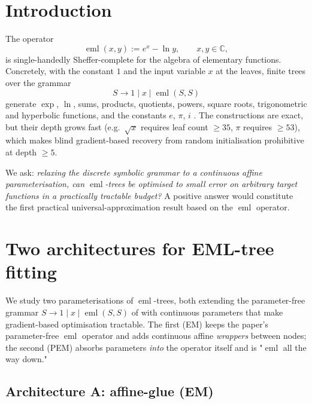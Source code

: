 \documentclass[11pt]{article}
\newcommand{\eml}{\operatorname{eml}}
\begin{document}
\section{Introduction}

The operator
\begin{equation}
\eml(x, y) := e^x - \ln y, \qquad x, y \in \mathbb{C},
\label{eq:eml}
\end{equation}
is single-handedly Sheffer-complete for the algebra of elementary functions.
Concretely, with the constant $1$ and the input variable $x$ at the leaves,
finite trees over the grammar
\[
S \to 1 \mid x \mid \eml(S, S)
\]
generate $\exp$, $\ln$, sums, products, quotients, powers, square roots,
trigonometric and hyperbolic functions, and the constants $e$, $\pi$, $i$
\cite{odrzywolek2026}. The constructions are exact, but their depth grows fast
(e.g.\ $\sqrt{x}$ requires leaf count $\geq 35$, $\pi$ requires $\geq 53$),
which makes blind gradient-based recovery from random initialisation
prohibitive at depth $\geq 5$.

We ask: \emph{relaxing the discrete symbolic grammar to a continuous affine
parameterisation, can $\eml$-trees be optimised to small error on
arbitrary target functions in a practically tractable budget?} A positive
answer would constitute the first practical universal-approximation result
based on the $\eml$ operator.

\section{Two architectures for EML-tree fitting}
\label{sec:cae}

We study two parameterisations of $\eml$-trees, both extending the
parameter-free grammar $S \to 1 \mid x \mid \eml(S,S)$ of
\cite{odrzywolek2026} with continuous parameters that make gradient-based
optimisation tractable. The first (EM) keeps the paper's parameter-free
$\eml$ operator and adds continuous affine \emph{wrappers} between nodes;
the second (PEM) absorbs parameters \emph{into} the operator itself and is
"$\eml$ all the way down."

\subsection{Architecture A: affine-glue (EM)}
\label{sec:cae:em}
\end{document}
